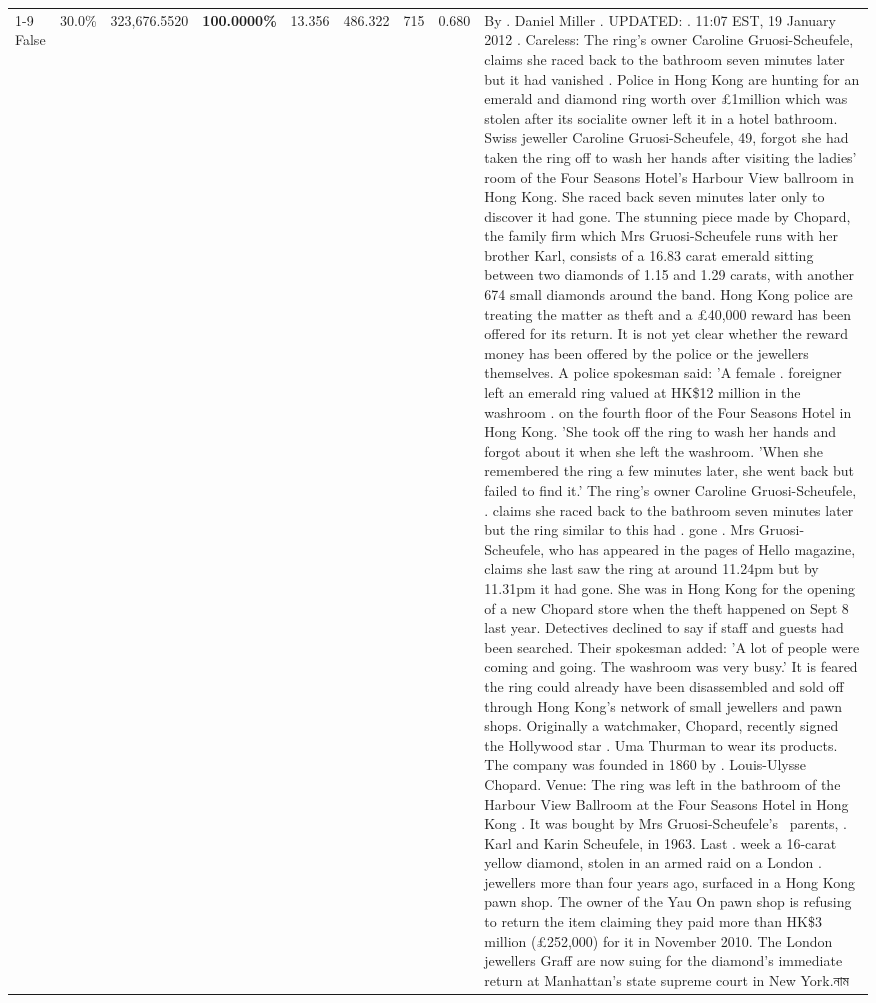 \begin{table}[H]
\begin{tabular}{lllrlllll}
\cline{1-9}
False & 30.0\% & 323,676.5520 & \bfseries \color{red} 100.0000\% & 13.356 & 486.322 & 715 & 0.680 & By . Daniel Miller . UPDATED: . 11:07 EST, 19 January 2012 . Careless: The ring's owner Caroline Gruosi-Scheufele, claims she raced back to the bathroom seven minutes later but it had vanished . Police in Hong Kong are hunting for an emerald and diamond ring worth over £1million which was stolen after its socialite owner left it in a hotel bathroom. Swiss jeweller Caroline Gruosi-Scheufele, 49, forgot she had taken the ring off to wash her hands after visiting the ladies' room of the Four Seasons Hotel's Harbour View ballroom in Hong Kong. She raced back seven minutes later only to discover it had gone. The stunning piece made by Chopard, the family firm which Mrs Gruosi-Scheufele runs with her brother Karl, consists of a 16.83 carat emerald sitting between two diamonds of 1.15 and 1.29 carats, with another 674 small diamonds around the band. Hong Kong police are treating the matter as theft and a £40,000 reward has been offered for its return. It is not yet clear whether the reward money has been offered by the police or the jewellers themselves. A police spokesman said: 'A female . foreigner left an emerald ring valued at HK\$12 million in the washroom . on the fourth floor of the Four Seasons Hotel in Hong Kong. 'She took off the ring to wash her hands and forgot about it when she left the washroom. 'When she remembered the ring a few minutes later, she went back but failed to find it.' The ring's owner Caroline Gruosi-Scheufele, . claims she raced back to the bathroom seven minutes later but the ring similar to this had . gone . Mrs Gruosi-Scheufele, who has appeared in the pages of Hello magazine, claims she last saw the ring at around 11.24pm but by 11.31pm it had gone. She was in Hong Kong for the opening of a new Chopard store when the theft happened on Sept 8 last year. Detectives declined to say if staff and guests had been searched. Their spokesman added: 'A lot of people were coming and going. The washroom was very busy.' It is feared the ring could already have been disassembled and sold off through Hong Kong's network of small jewellers and pawn shops. Originally a watchmaker, Chopard, recently signed the Hollywood star . Uma Thurman to wear its products. The company was founded in 1860 by . Louis-Ulysse Chopard. Venue: The ring was left in the bathroom of the Harbour View Ballroom at the Four Seasons Hotel in Hong Kong . It was bought by Mrs Gruosi-Scheufele's  parents, . Karl and Karin Scheufele, in 1963. Last . week a 16-carat yellow diamond, stolen in an armed raid on a London . jewellers more than four years ago, surfaced in a Hong Kong pawn shop. The owner of the Yau On pawn shop is refusing to return the item claiming they paid more than HK\$3 million (£252,000) for it in November 2010. The London jewellers Graff are now suing for the diamond’s immediate return at Manhattan’s state supreme court in New York.নাম \\

\end{tabular}
\end{table}
